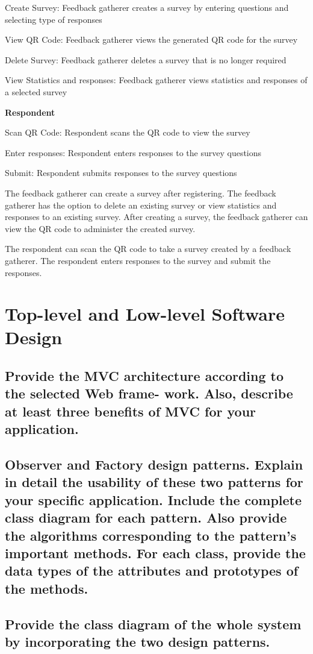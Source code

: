 \documentclass[letterpaper, 12 pt, conference]{ieeeconf}
\begin{document}
    Create Survey: Feedback gatherer creates a survey by entering questions and selecting type of responses
    
    View QR Code: Feedback gatherer views the generated QR code for the survey
    
    Delete Survey: Feedback gatherer deletes a survey that is no longer required
    
    View Statistics and responses: Feedback gatherer views statistics and responses of a selected survey
    
\textbf{Respondent}
    
    Scan QR Code: Respondent scans the QR code to view the survey
    
    Enter responses: Respondent enters responses to the survey questions
    
    Submit: Respondent submits responses to the survey questions

The feedback gatherer can create a survey after registering. The feedback gatherer has the option to delete an existing survey or view statistics and responses to an existing survey. After creating a survey, the feedback gatherer can view the QR code to administer the created survey.

The respondent can scan the QR code to take a survey created by a feedback gatherer. The respondent enters responses to the survey and submit the responses.

\section{Top-level and Low-level Software Design}
\subsection{Provide the MVC architecture according to the selected Web frame- work. Also, describe at least three benefits of MVC for your application.}
\subsection{Observer and Factory design patterns. Explain in detail the usability of these two patterns for your specific application. Include the complete class diagram for each pattern. Also provide the algorithms corresponding to the pattern’s important methods. For each class, provide the data types of the attributes and prototypes of the methods.}
\subsection{Provide the class diagram of the whole system by incorporating the two design patterns.}
\end{document}
